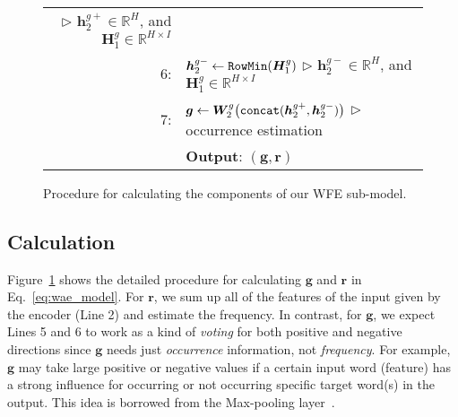 \documentclass[11pt]{article}
\begin{document}
\begin{figure}[t]
\begin{tabular}{rp{71mm}}
      \hspace{\fill}
      $\triangleright$ {\scriptsize $\bm{h}^{g+}_2\in\mathbb{R}^{H}$, and $\bm{H}^{g}_1\in\mathbb{R}^{H\times I}$}
      \\
6:&\hspace{0.0em}
      $\bm{h}^{g-}_2 \leftarrow \mbox{\tt RowMin}(\bm{H}^{g}_1)$
      \hspace{\fill}
      $\triangleright$ {\scriptsize $\bm{h}^{g-}_2\in\mathbb{R}^{H}$, and $\bm{H}^{g}_1\in\mathbb{R}^{H\times I}$}
      \\
7:&\hspace{0.0em}
      $ \bm{g} \leftarrow \bm{W}^{g}_2 \big( \mbox{\tt concat}(\bm{h}^{g+}_2, \bm{h}^{g-}_2)\big)$
      \hspace{\fill}
      $\triangleright$ {\scriptsize  occurrence estimation}
      \\
\  &\hspace{-1.2em}\textbf{Output}: $({\bm{g}}, {\bm{r}})$
      \\
  \hline
 \end{tabular}
 \caption{Procedure for calculating the components of our WFE sub-model.}
 \label{fig:wfe_calculation}
\end{figure}


\subsection{Calculation}
Figure~\ref{fig:wfe_calculation} shows the detailed procedure for calculating ${\bm{g}}$ and ${\bm{r}}$ in Eq.~\ref{eq:wae_model}.
For ${\bm r}$, we sum up all of the features of the input given by the encoder (Line 2) and estimate the frequency.
In contrast, for ${\bm g}$, we expect Lines 5 and 6 to work as a kind of {\it voting} for both positive and negative directions
   since ${\bm g}$ needs just {\it occurrence} information, not {\it frequency}.
For example, ${\bm g}$ may take large positive or negative values if a certain input word (feature) has a strong influence for occurring or not occurring specific target word(s) in the output.
This idea is borrowed from the Max-pooling layer~\cite{DBLP:conf/icml/GoodfellowWMCB13}.
\end{document}
